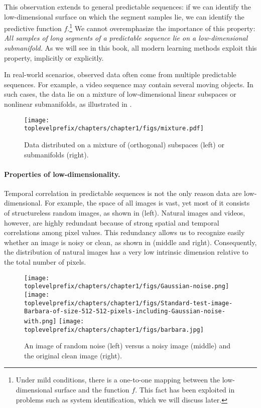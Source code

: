 \documentclass[../../book-main.tex]{subfiles}
\begin{document}
This observation extends to general predictable sequences: if we can identify the low-dimensional surface on which the segment samples lie, we can identify the predictive function \(f\).\footnote{Under mild conditions, there is a one-to-one mapping between the low-dimensional surface and the function \(f\). This fact has been exploited in problems such as system identification, which we will discuss later.} We cannot overemphasize the importance of this property: \textit{All samples of long segments of a predictable sequence lie on a low-dimensional submanifold.} As we will see in this book, all modern learning methods exploit this property, implicitly or explicitly.

In real-world scenarios, observed data often come from multiple predictable sequences. For example, a video sequence may contain several moving objects. In such cases, the data lie on a mixture of low-dimensional linear subspaces or nonlinear submanifolds, as illustrated in . 
\begin{figure}
    \centering
    \texttt{[image: \\toplevelprefix/chapters/chapter1/figs/mixture.pdf]}
    \caption{Data distributed on a mixture of (orthogonal) subspaces (left) or submanifolds (right).}
    \label{fig:mixture-models}
\end{figure}


\paragraph{Properties of low-dimensionality.}
Temporal correlation in predictable sequences is not the only reason data are low-dimensional. For example, the space of all images is vast, yet most of it consists of structureless random images, as shown in  (left). Natural images and videos, however, are highly redundant because of strong spatial and temporal correlations among pixel values. This redundancy allows us to recognize easily whether an image is noisy or clean, as shown in  (middle and right). Consequently, the distribution of natural images has a very low intrinsic dimension relative to the total number of pixels.

\begin{figure}
    \centering
    \texttt{[image: \\toplevelprefix/chapters/chapter1/figs/Gaussian-noise.png]}\hspace{2mm} 
    \texttt{[image: \\toplevelprefix/chapters/chapter1/figs/Standard-test-image-Barbara-of-size-512-512-pixels-including-Gaussian-noise-with.png]} \hspace{2mm} 
    \texttt{[image: \\toplevelprefix/chapters/chapter1/figs/barbara.jpg]}
    \caption{An image of random noise (left) versus a noisy image (middle) and the original clean image (right).}
    \label{fig:noise-image}
\end{figure}
\end{document}
